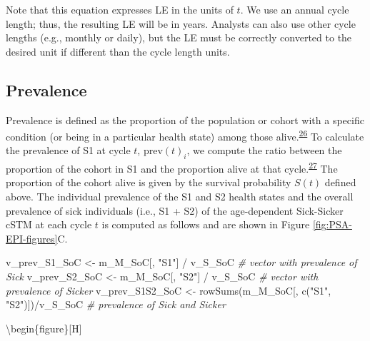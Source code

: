 \documentclass[
]{article}
\newenvironment{Shaded}{\begin{snugshade}}{\end{snugshade}}
\newcommand{\CommentTok}[1]{\textcolor[rgb]{0.56,0.35,0.01}{\textit{#1}}}
\newcommand{\FunctionTok}[1]{\textcolor[rgb]{0.00,0.00,0.00}{#1}}
\newcommand{\NormalTok}[1]{#1}
\newcommand{\OtherTok}[1]{\textcolor[rgb]{0.56,0.35,0.01}{#1}}
\newcommand{\SpecialCharTok}[1]{\textcolor[rgb]{0.00,0.00,0.00}{#1}}
\newcommand{\StringTok}[1]{\textcolor[rgb]{0.31,0.60,0.02}{#1}}
\begin{document}
Note that this equation expresses LE in the units of \(t\). We use an annual cycle length; thus, the resulting LE will be in years. Analysts can also use other cycle lengths (e.g., monthly or daily), but the LE must be correctly converted to the desired unit if different than the cycle length units.

\hypertarget{prevalence}{%
\subsection{Prevalence}\label{prevalence}}

Prevalence is defined as the proportion of the population or cohort with a specific condition (or being in a particular health state) among those alive.\textsuperscript{\protect\hyperlink{ref-Rothman2008h}{26}} To calculate the prevalence of S1 at cycle \(t\), \(\text{prev}(t)_i\), we compute the ratio between the proportion of the cohort in S1 and the proportion alive at that cycle.\textsuperscript{\protect\hyperlink{ref-Keiding1991}{27}} The proportion of the cohort alive is given by the survival probability \(S(t)\) defined above. The individual prevalence of the S1 and S2 health states and the overall prevalence of sick individuals (i.e., S1 + S2) of the age-dependent Sick-Sicker cSTM at each cycle \(t\) is computed as follows and are shown in Figure \ref{fig:PSA-EPI-figures}C.

\begin{Shaded}
\begin{Highlighting}[]
\NormalTok{v\_prev\_S1\_SoC   }\OtherTok{\textless{}{-}}\NormalTok{ m\_M\_SoC[, }\StringTok{"S1"}\NormalTok{] }\SpecialCharTok{/}\NormalTok{ v\_S\_SoC          }\CommentTok{\# vector with prevalence of Sick}
\NormalTok{v\_prev\_S2\_SoC   }\OtherTok{\textless{}{-}}\NormalTok{ m\_M\_SoC[, }\StringTok{"S2"}\NormalTok{] }\SpecialCharTok{/}\NormalTok{ v\_S\_SoC          }\CommentTok{\# vector with prevalence of Sicker}
\NormalTok{v\_prev\_S1S2\_SoC }\OtherTok{\textless{}{-}} \FunctionTok{rowSums}\NormalTok{(m\_M\_SoC[, }\FunctionTok{c}\NormalTok{(}\StringTok{"S1"}\NormalTok{, }\StringTok{"S2"}\NormalTok{)])}\SpecialCharTok{/}\NormalTok{v\_S\_SoC }\CommentTok{\# prevalence of Sick and Sicker}
\end{Highlighting}
\end{Shaded}

\textbackslash begin\{figure\}{[}H{]}
\end{document}
